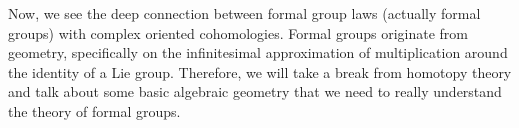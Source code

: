 Now, we see the deep connection between formal group laws (actually formal groups) with complex oriented cohomologies. Formal groups originate from geometry, specifically on the infinitesimal approximation of multiplication around the identity of a Lie group. Therefore, we will take a break from homotopy theory and talk about some basic algebraic geometry that we need to really understand the theory of formal groups. 